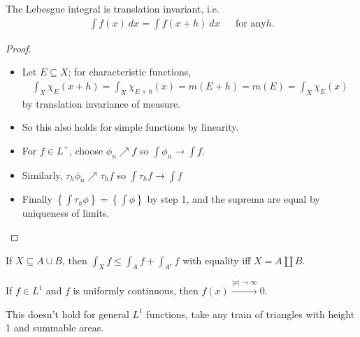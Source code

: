 \begin{proposition}

The Lebesgue integral is translation invariant, i.e.
\begin{align*}
\int f(x) ~dx = \int f(x + h) ~dx &&\text{for any} h
.\end{align*}

\end{proposition}

\begin{proof}

\envlist

\begin{itemize}
\tightlist
\item
  Let \(E\subseteq X\); for characteristic functions,
  \begin{align*}
  \int_X \chi_E(x+h) 
  = \int_{X} \chi_{E+h}(x) = m(E+h) = m(E) = \int_X \chi_E(x)
  \end{align*}
  by translation invariance of measure.
\item
  So this also holds for simple functions by linearity.
\item
  For \(f\in L^+\), choose \(\phi_n \nearrow f\) so
  \(\int \phi_n \to \int f\).
\item
  Similarly, \(\tau_h \phi_n \nearrow \tau_h f\) so
  \(\int \tau_h f \to \int f\)
\item
  Finally
  \(\left\{{\int \tau_h \phi}\right\} = \left\{{\int \phi}\right\}\) by
  step 1, and the suprema are equal by uniqueness of limits.
\end{itemize}

\end{proof}

\begin{proposition}

If \(X \subseteq A \cup B\), then
\(\int_X f \leq \int_A f + \int_{A^c} f\) with equality iff
\(X = A{\coprod}B\).

\end{proposition}

\begin{proposition}

If \(f \in L^1\) and \(f\) is uniformly continuous, then
\(f(x) \overset{{\left\lvert {x} \right\rvert}\to\infty}\to 0\).

\end{proposition}

\begin{warnings}

This doesn't hold for general \(L^1\) functions, take any train of
triangles with height 1 and summable areas.

\end{warnings}


